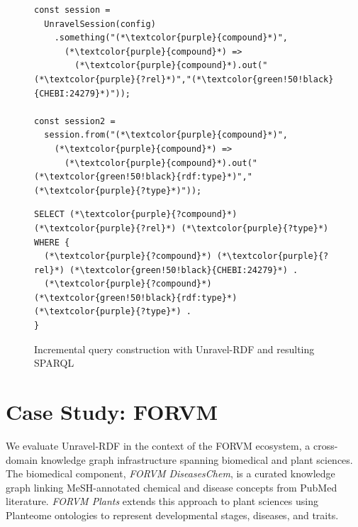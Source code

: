 \documentclass[
]{ceurart}
\begin{document}
\begin{figure}[t]
\centering
\caption{Incremental query construction with Unravel-RDF and resulting SPARQL}
\label{fig:unravel-sparql-example}

{\footnotesize
\begin{minipage}[t]{0.50\textwidth}
\centering
\begin{lstlisting}[style=unraveljs,basicstyle=\footnotesize\ttfamily]
const session =
  UnravelSession(config)
    .something("(*\textcolor{purple}{compound}*)",
      (*\textcolor{purple}{compound}*) =>
        (*\textcolor{purple}{compound}*).out("(*\textcolor{purple}{?rel}*)","(*\textcolor{green!50!black}{CHEBI:24279}*)"));

const session2 =
  session.from("(*\textcolor{purple}{compound}*)",
    (*\textcolor{purple}{compound}*) =>
      (*\textcolor{purple}{compound}*).out("(*\textcolor{green!50!black}{rdf:type}*)","(*\textcolor{purple}{?type}*)"));
\end{lstlisting}
\end{minipage}%
\hspace{0.02\textwidth}%
\begin{minipage}[t]{0.44  \textwidth}
\centering
\begin{lstlisting}[style=sparqlstyle,basicstyle=\footnotesize\ttfamily]
SELECT (*\textcolor{purple}{?compound}*) (*\textcolor{purple}{?rel}*) (*\textcolor{purple}{?type}*)
WHERE {
  (*\textcolor{purple}{?compound}*) (*\textcolor{purple}{?rel}*) (*\textcolor{green!50!black}{CHEBI:24279}*) .
  (*\textcolor{purple}{?compound}*) (*\textcolor{green!50!black}{rdf:type}*) (*\textcolor{purple}{?type}*) .
}
\end{lstlisting}
\end{minipage}
}
\end{figure}

\section{Case Study: FORVM}

We evaluate Unravel-RDF in the context of the FORVM ecosystem, a
cross-domain knowledge graph infrastructure spanning biomedical and
plant sciences. The biomedical component, \textit{FORVM
DiseasesChem}\citep{delmas_forum_2021}, is a curated knowledge graph
linking MeSH-annotated chemical and disease concepts from PubMed
literature. \textit{FORVM Plants} extends this approach to plant
sciences using Planteome ontologies to represent developmental stages,
diseases, and traits.
\end{document}
